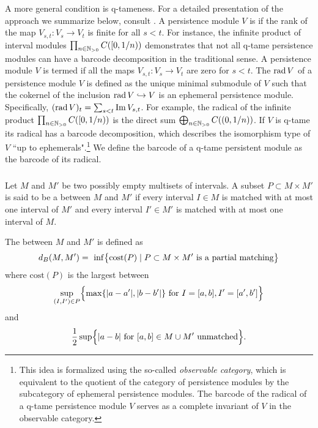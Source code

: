 A more general condition is q-tameness.
For a detailed presentation of the approach we summarize below, consult \cite{Chazal.2016a, Chazal.2016b}.
A persistence module \(V\) is  if the rank of the map \(V_{s,t} \colon V_s \to V_t\) is finite for all \(s < t\).
For instance, the infinite product of interval modules \(\prod_{n \in \N_{> 0}} C([0,1/n))\) demonstrates that not all q-tame persistence modules can have a barcode decomposition in the traditional sense.
A persistence module \(V\) is termed  if all the maps \(V_{s,t} \colon V_s \to V_t\) are zero for \(s < t\).
The  \(\rad V\) of a persistence module \(V\) is defined as the unique minimal submodule of \(V\) such that the cokernel of the inclusion \(\rad V \hookrightarrow V\) is an ephemeral persistence module.
Specifically, \((\rad V)_t = \sum_{s<t} \img V_{s,t}\).
For example, the radical of the infinite product \(\prod_{n \in \N_{> 0}} C([0, 1/n))\) is the direct sum \(\bigoplus_{n \in \N_{> 0}} C((0,1/n))\).
If \(V\) is q-tame its radical has a barcode decomposition, which describes the isomorphism type of \(V\) ``up to ephemerals".\footnote{
This idea is formalized using the so-called \textit{observable category}, which is equivalent to the quotient of the category of persistence modules by the subcategory of ephemeral persistence modules.
The barcode of the radical of a q-tame persistence module \(V\) serves as a complete invariant of \(V\) in the observable category.}
We define the barcode of a q-tame persistent module as the barcode of its radical.

\subsubsection{}
Let $M$ and $M'$ be two possibly empty multisets of intervals.
A subset $P \subset M \times M'$ is said to be a  between $M$ and $M'$ if every interval $I \in M$ is matched with at most one interval of $M'$ and every interval $I' \in M'$ is matched with at most one interval of $M$.

The  between $M$ and $M'$ is defined as
\[
d_B(M, M') = \
\inf \set[\big]{\mathrm{cost}(P) \mid P \subset M \times M' \text{ is a partial matching}}
\]
where $\mathrm{cost}(P)$ is the largest between
\[
\sup_{(I, I') \in P} \set[\Big]{\max\set{|a - a'|, |b - b'|} \text{ for } I = [a, b], I' = [a', b']}
\]
and
\[
\frac{1}{2} \sup \set[\Big]{|a - b| \text{ for } [a,b] \in M \cup M' \text{ unmatched}}.
\]


